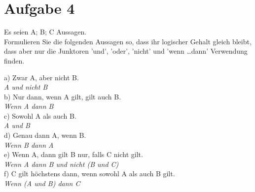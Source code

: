\section*{Aufgabe 4}

Es seien A; B; C Aussagen.\\

Formulieren Sie die folgenden Aussagen so, dass ihr logischer Gehalt gleich bleibt, dass aber nur die Junktoren 'und', 'oder', 'nicht' und 'wenn \dots dann' Verwendung finden.

a) Zwar A, aber nicht B.\\

\textit{A und nicht B}\\

b) Nur dann, wenn A gilt, gilt auch B.\\

\textit{Wenn A dann B}\\

c) Sowohl A als auch B.\\

\textit{A und B}\\

d) Genau dann A, wenn B.\\

\textit{Wenn B dann A}\\

e) Wenn A, dann gilt B nur, falls C nicht gilt.\\

\textit{Wenn A dann B und nicht (B und C)}\\

f) C gilt höchstens dann, wenn sowohl A als auch B gilt.\\

\textit{Wenn (A und B) dann C}\\